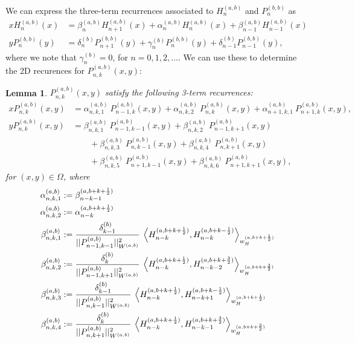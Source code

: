 \documentclass[11pt, oneside]{article}   	%
\newcommand{\half}{\frac{1}{2}}
\newcommand{\Pnk}{P_{n,k}}
\newcommand{\alphaab}{\alpha^{(a,b)}}
\newcommand{\betaab}{\beta^{(a,b)}}
\newtheorem{lemma}{Lemma}
\begin{document}
We can express the three-term recurrences associated to $H_n^{(a,b)}$ and $P_n^{(b,b)}$ as
\begin{align}
x H_n^{(a,b)}(x) &= \beta_n^{(a,b)} H_{n+1}^{(a,b)}(x) + \alpha_n^{(a,b)} H_n^{(a,b)}(x) + \beta_{n-1}^{(a,b)} H_{n-1}^{(a,b)}(x) 
\label{eqn:Hrecurrence} \\
y P_n^{(b,b)}(y) &= \delta_n^{(b)} P_{n+1}^{(b,b)}(y) + \gamma_n^{(b)} P_n^{(b,b)}(y) + \delta_{n-1}^{(b)} P_{n-1}^{(b,b)}(y),
\end{align}
where we note that \(\gamma_n^{(b)} = 0\), for \( n = 0,1,2,\dots\). We can use these to determine the 2D recurences for $P_{n,k}^{(a,b)}(x,y)$:

\begin{lemma}
$\Pnk^{(a,b)}(x,y)$ satisfy the following 3-term recurrences:
\begin{align}
x \Pnk^{(a,b)}(x,y) &= \alphaab_{n,k,1} \: P_{n-1, k}^{(a,b)}(x, y) + \alphaab_{n,k,2} \: P_{n, k}^{(a,b)}(x, y) + \alphaab_{n+1,k,1} \: P_{n+1, k}^{(a,b)}(x, y), \\
y \Pnk^{(a,b)}(x,y) &= \betaab_{n,k,1} \: P_{n-1, k-1}^{(a,b)}(x, y) + \betaab_{n,k,2} \: P_{n-1, k+1}^{(a,b)}(x, y) \nonumber \\
		& \quad \quad + \betaab_{n,k,3} \: P_{n, k-1}^{(a,b)}(x, y) + \betaab_{n,k,4} \: P_{n, k+1}^{(a,b)}(x, y) \nonumber \\
		& \quad \quad + \betaab_{n,k,5} \: P_{n+1, k-1}^{(a,b)}(x, y) + \betaab_{n,k,6} \: P_{n+1, k+1}^{(a,b)}(x, y),
\end{align}
for \((x,y) \in \Omega\), where
\begin{align}
\alphaab_{n,k,1} &:= \beta_{n-k-1}^{(a, b+k+\half)} \\
\alphaab_{n,k,2} &:= \alpha_{n-k}^{(a, b+k+\half)} \\
\betaab_{n,k,1} &:= \frac{\delta_{k-1}^{(b)}}{|| P_{n-1,k-1}^{(a,b)} ||_{W^{(a,b)}}^2} \: \ip<H_{n-k}^{(a, b+k+\half)}, H_{n-k}^{(a, b+k-\half)}>_{w_H^{(a, b+k+\half)}} \\
\betaab_{n,k,2} &:= \frac{\delta_{k}^{(b)}}{|| P_{n-1,k+1}^{(a,b)} ||_{W^{(a,b)}}^2} \: \ip<H_{n-k}^{(a, b+k+\half)}, H_{n-k-2}^{(a, b+k+\frac{3}{2})}>_{w_H^{(a, b+k+\frac{3}{2})}} \\
\betaab_{n,k,3} &:= \frac{\delta_{k-1}^{(b)}}{|| P_{n,k-1}^{(a,b)} ||_{W^{(a,b)}}^2} \: \ip<H_{n-k}^{(a, b+k+\half)}, H_{n-k+1}^{(a, b+k-\half)}>_{w_H^{(a, b+k+\half)}} \\
\betaab_{n,k,4} &:= \frac{\delta_{k}^{(b)}}{|| P_{n,k+1}^{(a,b)} ||_{W^{(a,b)}}^2} \: \ip<H_{n-k}^{(a, b+k+\half)}, H_{n-k-1}^{(a, b+k+\frac{3}{2})}>_{w_H^{(a, b+k+\frac{3}{2})}} \\

\end{align}
\end{lemma}
\end{document}
